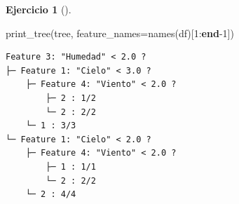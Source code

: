 \documentclass[
  a4paper,
]{scrreport}
\newenvironment{Shaded}{\begin{snugshade}}{\end{snugshade}}
\newcommand{\FloatTok}[1]{\textcolor[rgb]{0.68,0.00,0.00}{#1}}
\newcommand{\FunctionTok}[1]{\textcolor[rgb]{0.28,0.35,0.67}{#1}}
\newcommand{\KeywordTok}[1]{\textcolor[rgb]{0.00,0.23,0.31}{\textbf{#1}}}
\newcommand{\NormalTok}[1]{\textcolor[rgb]{0.00,0.23,0.31}{#1}}
\newcommand{\OperatorTok}[1]{\textcolor[rgb]{0.37,0.37,0.37}{#1}}
\theoremstyle{definition}
\newtheorem{exercise}{Ejercicio}[chapter]
\theoremstyle{remark}
\begin{document}
\begin{exercise}[]
\begin{enumerate}
\begin{tcolorbox}
  \end{tcolorbox}

  \begin{tcolorbox}[enhanced jigsaw, left=2mm, colback=white, coltitle=black, opacitybacktitle=0.6, titlerule=0mm, breakable, bottomrule=.15mm, toptitle=1mm, bottomtitle=1mm, colbacktitle=quarto-callout-tip-color!10!white, opacityback=0, rightrule=.15mm, title=\textcolor{quarto-callout-tip-color}{\faLightbulb}\hspace{0.5em}{Solución}, colframe=quarto-callout-tip-color-frame, arc=.35mm, leftrule=.75mm, toprule=.15mm]

\begin{Shaded}
\begin{Highlighting}[]
\FunctionTok{print\_tree}\NormalTok{(tree, feature\_names}\OperatorTok{=}\FunctionTok{names}\NormalTok{(df)[}\FloatTok{1}\OperatorTok{:}\KeywordTok{end}\OperatorTok{{-}}\FloatTok{1}\NormalTok{])}
\end{Highlighting}
\end{Shaded}

\begin{verbatim}
Feature 3: "Humedad" < 2.0 ?
├─ Feature 1: "Cielo" < 3.0 ?
    ├─ Feature 4: "Viento" < 2.0 ?
        ├─ 2 : 1/2
        └─ 2 : 2/2
    └─ 1 : 3/3
└─ Feature 1: "Cielo" < 2.0 ?
    ├─ Feature 4: "Viento" < 2.0 ?
        ├─ 1 : 1/1
        └─ 2 : 2/2
    └─ 2 : 4/4
\end{verbatim}

  \end{tcolorbox}
\end{enumerate}

\end{exercise}
\end{document}
